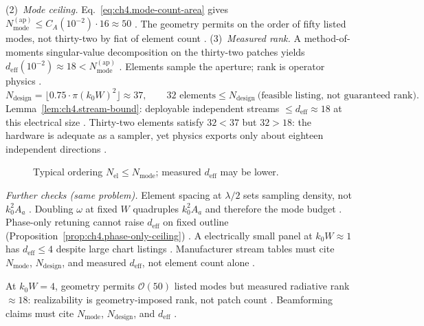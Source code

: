 (2)~\emph{Mode ceiling.} Eq.~\eqref{eq:ch4.mode-count-area} gives $N_{\mathrm{mode}}^{\mathrm{(ap)}}\le C_{A}(10^{-2})\cdot16\approx50$ . The geometry permits on the order of fifty listed modes, not thirty-two by fiat of element count .
(3)~\emph{Measured rank.} A method-of-moments singular-value decomposition on the thirty-two patches yields $d_{\mathrm{eff}}(10^{-2})\approx18<N_{\mathrm{mode}}^{\mathrm{(ap)}}$ . Elements sample the aperture; rank is operator physics .
\begin{equation}
\label{eq:ch4.ex-mode-count-numeric}
N_{\mathrm{design}}=\lfloor0.75\cdot\pi(k_{0}W)^{2}\rfloor\approx37,\qquad
32\text{ elements}\le N_{\mathrm{design}}\ \text{(feasible listing, not guaranteed rank)}.
\end{equation}
Lemma~\ref{lem:ch4.stream-bound}: deployable independent streams $\le d_{\mathrm{eff}}\approx18$ at this electrical size . Thirty-two elements satisfy $32<37$ but $32>18$: the hardware is adequate as a sampler, yet physics exports only about eighteen independent directions .

\begin{figure}[t]
\centering
{}
\caption{Typical ordering $N_{\mathrm{el}}\le N_{\mathrm{mode}}$; measured $d_{\mathrm{eff}}$ may be lower.}
\label{fig:ch4.ex-element-rank-order}
\end{figure}

\emph{Further checks (same problem).} Element spacing at $\lambda/2$ sets sampling density, not $k_{0}^{2}A_{a}$ . Doubling $\omega$ at fixed $W$ quadruples $k_{0}^{2}A_{a}$ and therefore the mode budget . Phase-only retuning cannot raise $d_{\mathrm{eff}}$ on fixed outline (Proposition~\ref{prop:ch4.phase-only-ceiling}) . A electrically small panel at $k_{0}W\approx1$ has $d_{\mathrm{eff}}\le4$ despite large chart listings . Manufacturer stream tables must cite $N_{\mathrm{mode}}$, $N_{\mathrm{design}}$, and measured $d_{\mathrm{eff}}$, not element count alone .

At $k_{0}W=4$, geometry permits $\mathcal{O}(50)$ listed modes but measured radiative rank $\approx18$: realizability is geometry-imposed rank, not patch count . Beamforming claims must cite $N_{\mathrm{mode}}$, $N_{\mathrm{design}}$, and $d_{\mathrm{eff}}$ .

